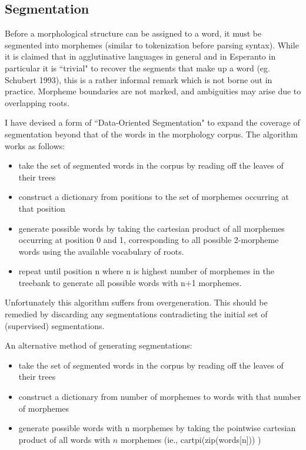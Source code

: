 \documentclass[10pt,a4paper]{article}
\begin{document}
\subsection{Segmentation}

Before a morphological structure can be assigned to a word, it must be
segmented into morphemes (similar to tokenization before parsing syntax). While
it is claimed that in agglutinative languages in general and in Esperanto in
particular it is ``trivial" to recover the segments that make up a word (eg.
Schubert 1993), this is a rather informal remark which is not borne out in
practice.  Morpheme boundaries are not marked, and ambiguities may arise due to
overlapping roots.

I have devised a form of ``Data-Oriented Segmentation" to expand the
coverage of segmentation beyond that of the words in the morphology corpus. The
algorithm works as follows:

\begin{itemize}
\item take the set of segmented words in the corpus by reading off the leaves of their trees
\item construct a dictionary from positions to the set of morphemes occurring at that position
\item generate possible words by taking the cartesian product of all morphemes occurring
 at position 0 and 1, corresponding to all possible 2-morpheme words using the available
 vocabulary of roots.
\item repeat until position n where n is highest number of morphemes in the treebank to
 generate all possible words with n+1 morphemes.
\end{itemize}

Unfortunately this algorithm suffers from overgeneration. This should be
remedied by discarding any segmentations contradicting the initial set of
(supervised) segmentations. 

An alternative method of generating segmentations:

\begin{itemize}
\item take the set of segmented words in the corpus by reading off the leaves of their trees
\item construct a dictionary from number of morphemes to words with that number of morphemes
\item generate possible words with n morphemes by taking the pointwise cartesian product of
 all words with $n$ morphemes (ie., cartpi(zip(words[n])) )
\end{itemize}
\end{document}
